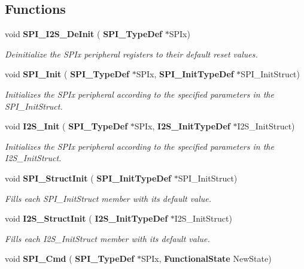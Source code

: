 \subsection*{Functions}
\begin{DoxyCompactItemize}
\item 
void \textbf{ S\+P\+I\+\_\+\+I2\+S\+\_\+\+De\+Init} (\textbf{ S\+P\+I\+\_\+\+Type\+Def} $\ast$S\+P\+Ix)
\begin{DoxyCompactList}\small\item\em Deinitialize the S\+P\+Ix peripheral registers to their default reset values. \end{DoxyCompactList}\item 
void \textbf{ S\+P\+I\+\_\+\+Init} (\textbf{ S\+P\+I\+\_\+\+Type\+Def} $\ast$S\+P\+Ix, \textbf{ S\+P\+I\+\_\+\+Init\+Type\+Def} $\ast$S\+P\+I\+\_\+\+Init\+Struct)
\begin{DoxyCompactList}\small\item\em Initializes the S\+P\+Ix peripheral according to the specified parameters in the S\+P\+I\+\_\+\+Init\+Struct. \end{DoxyCompactList}\item 
void \textbf{ I2\+S\+\_\+\+Init} (\textbf{ S\+P\+I\+\_\+\+Type\+Def} $\ast$S\+P\+Ix, \textbf{ I2\+S\+\_\+\+Init\+Type\+Def} $\ast$I2\+S\+\_\+\+Init\+Struct)
\begin{DoxyCompactList}\small\item\em Initializes the S\+P\+Ix peripheral according to the specified parameters in the I2\+S\+\_\+\+Init\+Struct. \end{DoxyCompactList}\item 
void \textbf{ S\+P\+I\+\_\+\+Struct\+Init} (\textbf{ S\+P\+I\+\_\+\+Init\+Type\+Def} $\ast$S\+P\+I\+\_\+\+Init\+Struct)
\begin{DoxyCompactList}\small\item\em Fills each S\+P\+I\+\_\+\+Init\+Struct member with its default value. \end{DoxyCompactList}\item 
void \textbf{ I2\+S\+\_\+\+Struct\+Init} (\textbf{ I2\+S\+\_\+\+Init\+Type\+Def} $\ast$I2\+S\+\_\+\+Init\+Struct)
\begin{DoxyCompactList}\small\item\em Fills each I2\+S\+\_\+\+Init\+Struct member with its default value. \end{DoxyCompactList}\item 
void \textbf{ S\+P\+I\+\_\+\+Cmd} (\textbf{ S\+P\+I\+\_\+\+Type\+Def} $\ast$S\+P\+Ix, \textbf{ Functional\+State} New\+State)

\end{DoxyCompactItemize}
